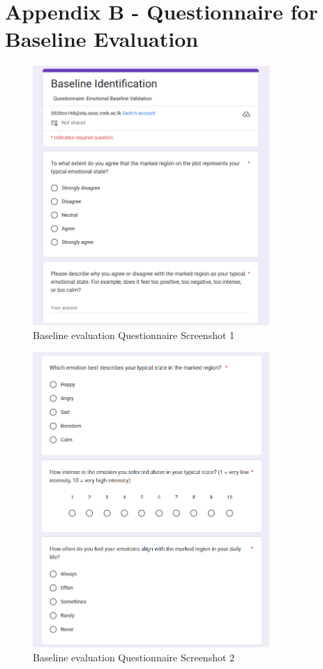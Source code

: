 \section*{Appendix B - Questionnaire for Baseline Evaluation}
\label{sec:appendix-questionnaire}

\begin{figure}[H]
    \centering
    \includegraphics[width=0.8\textwidth]{appendix/imgs/bq1.png}
    \caption{Baseline evaluation Questionnaire Screenshot 1}
\end{figure}

\begin{figure}[H]
    \centering
    \includegraphics[width=0.8\textwidth]{appendix/imgs/bq2.png}
    \caption{Baseline evaluation Questionnaire Screenshot 2}
\end{figure}


